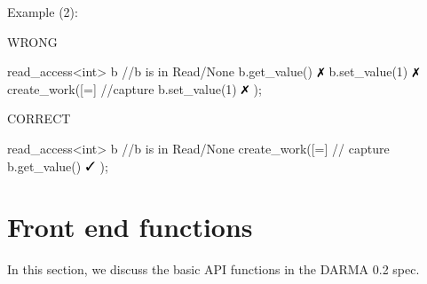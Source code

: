 Example (2): 
\hspace{-0.75cm}
\begin{minipage}[t]{0.45\linewidth}%
\centering
WRONG
\begin{vaspPseudo}
read_access<int> b
//b is in Read/None
b.get_value()   $\no$
b.set_value(1)  $\no$
create_work([=]{ //capture
  b.set_value(1) $\no$
});
\end{vaspPseudo}
\end{minipage}
\hspace{0.55cm}
\begin{minipage}[t]{0.45\linewidth}
\centering
CORRECT
\begin{vaspPseudo}
read_access<int> b
//b is in Read/None
create_work([=]{ // capture
  b.get_value()  $\yes$
});
\end{vaspPseudo}
\end{minipage}









\clearpage
\section{Front end functions}

In this section, we discuss the basic API 
functions in the DARMA 0.2 spec.


